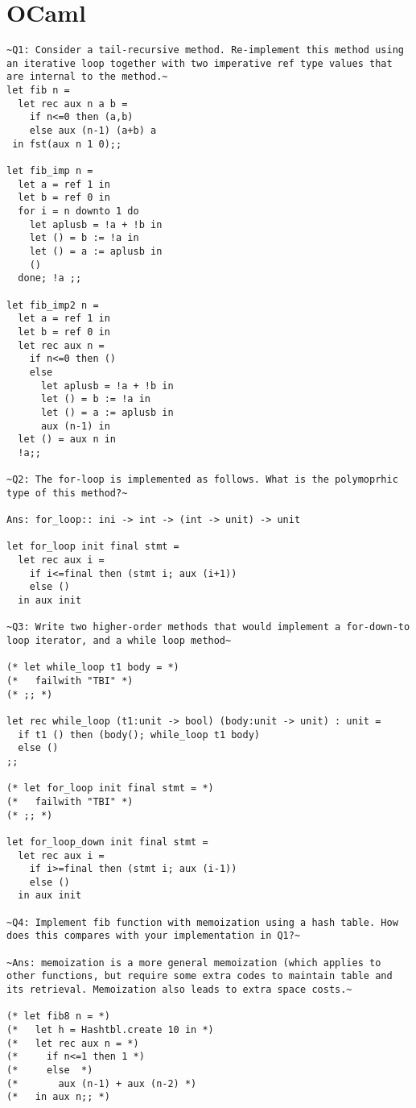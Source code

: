 \documentclass[fontsize=10pt]{slnotes}
\begin{document}
\clearpage\chapter{OCaml}
\begin{lstlisting}[escapechar=\~,escapebegin=\rmfamily,language={[Objective]Caml}]
~Q1: Consider a tail-recursive method. Re-implement this method using an iterative loop together with two imperative ref type values that are internal to the method.~
let fib n =
  let rec aux n a b =
    if n<=0 then (a,b)
    else aux (n-1) (a+b) a
 in fst(aux n 1 0);;

let fib_imp n =
  let a = ref 1 in
  let b = ref 0 in
  for i = n downto 1 do
    let aplusb = !a + !b in
    let () = b := !a in
    let () = a := aplusb in
    ()
  done; !a ;;

let fib_imp2 n =
  let a = ref 1 in
  let b = ref 0 in
  let rec aux n =
    if n<=0 then ()
    else
      let aplusb = !a + !b in
      let () = b := !a in
      let () = a := aplusb in
      aux (n-1) in
  let () = aux n in
  !a;;

~Q2: The for-loop is implemented as follows. What is the polymoprhic type of this method?~

Ans: for_loop:: ini -> int -> (int -> unit) -> unit

let for_loop init final stmt =
  let rec aux i =
    if i<=final then (stmt i; aux (i+1))
    else ()
  in aux init

~Q3: Write two higher-order methods that would implement a for-down-to loop iterator, and a while loop method~

(* let while_loop t1 body = *)
(*   failwith "TBI" *)
(* ;; *)

let rec while_loop (t1:unit -> bool) (body:unit -> unit) : unit =
  if t1 () then (body(); while_loop t1 body)
  else ()
;;

(* let for_loop init final stmt = *)
(*   failwith "TBI" *)
(* ;; *)

let for_loop_down init final stmt =
  let rec aux i =
    if i>=final then (stmt i; aux (i-1))
    else ()
  in aux init

~Q4: Implement fib function with memoization using a hash table. How does this compares with your implementation in Q1?~

~Ans: memoization is a more general memoization (which applies to other functions, but require some extra codes to maintain table and its retrieval. Memoization also leads to extra space costs.~

(* let fib8 n = *)
(*   let h = Hashtbl.create 10 in *)
(*   let rec aux n = *)
(*     if n<=1 then 1 *)
(*     else  *)
(*       aux (n-1) + aux (n-2) *)
(*   in aux n;; *)


\end{lstlisting}
\end{document}
